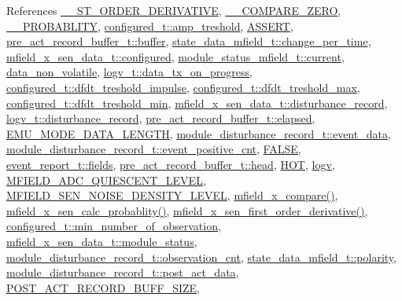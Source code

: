 References \hyperlink{a00021_source_l00030}{\+\_\+\+\_\+S\+T\+\_\+\+O\+R\+D\+E\+R\+\_\+\+D\+E\+R\+I\+V\+A\+T\+I\+V\+E}, \hyperlink{a00021_source_l00027}{\+\_\+\+\_\+\+C\+O\+M\+P\+A\+R\+E\+\_\+\+Z\+E\+R\+O}, \hyperlink{a00021_source_l00033}{\+\_\+\+\_\+\+P\+R\+O\+B\+A\+B\+L\+I\+T\+Y}, \hyperlink{a00021_a4b3bbfb0267daea1432f2603825ade62}{configured\+\_\+t\+::amp\+\_\+treshold}, \hyperlink{a00072_source_l00059}{A\+S\+S\+E\+R\+T}, \hyperlink{a00022_source_l00137}{pre\+\_\+act\+\_\+record\+\_\+buffer\+\_\+t\+::buffer}, \hyperlink{a00019_source_l00102}{state\+\_\+data\+\_\+mfield\+\_\+t\+::change\+\_\+per\+\_\+time}, \hyperlink{a00025_source_l00036}{mfield\+\_\+x\+\_\+sen\+\_\+data\+\_\+t\+::configured}, \hyperlink{a00019_source_l00108}{module\+\_\+status\+\_\+mfield\+\_\+t\+::current}, \hyperlink{a00060_source_l00016}{data\+\_\+non\+\_\+volatile}, \hyperlink{a00021_a6cdefde69642ef511e3252c38be68516}{logv\+\_\+t\+::data\+\_\+tx\+\_\+on\+\_\+progress}, \hyperlink{a00021_source_l00189}{configured\+\_\+t\+::dfdt\+\_\+treshold\+\_\+impulse}, \hyperlink{a00021_source_l00190}{configured\+\_\+t\+::dfdt\+\_\+treshold\+\_\+max}, \hyperlink{a00021_source_l00191}{configured\+\_\+t\+::dfdt\+\_\+treshold\+\_\+min}, \hyperlink{a00025_source_l00041}{mfield\+\_\+x\+\_\+sen\+\_\+data\+\_\+t\+::disturbance\+\_\+record}, \hyperlink{a00021_a11ed024c2cc5c53c79b2c0a8b35e3c06}{logv\+\_\+t\+::disturbance\+\_\+record}, \hyperlink{a00022_source_l00140}{pre\+\_\+act\+\_\+record\+\_\+buffer\+\_\+t\+::elapsed}, \hyperlink{a00022_source_l00015}{E\+M\+U\+\_\+\+M\+O\+D\+E\+\_\+\+D\+A\+T\+A\+\_\+\+L\+E\+N\+G\+T\+H}, \hyperlink{a00022_source_l00228}{module\+\_\+disturbance\+\_\+record\+\_\+t\+::event\+\_\+data}, \hyperlink{a00022_source_l00182}{module\+\_\+disturbance\+\_\+record\+\_\+t\+::event\+\_\+positive\+\_\+cnt}, \hyperlink{a00040_source_l00086}{F\+A\+L\+S\+E}, \hyperlink{a00021_a5296d090c085b0421fdf5a86e382abea}{event\+\_\+report\+\_\+t\+::fields}, \hyperlink{a00022_source_l00142}{pre\+\_\+act\+\_\+record\+\_\+buffer\+\_\+t\+::head}, \hyperlink{a00021_source_l00153}{H\+O\+T}, \hyperlink{a00038_source_l00036}{logv}, \hyperlink{a00019_source_l00029}{M\+F\+I\+E\+L\+D\+\_\+\+A\+D\+C\+\_\+\+Q\+U\+I\+E\+S\+C\+E\+N\+T\+\_\+\+L\+E\+V\+E\+L}, \hyperlink{a00019_source_l00031}{M\+F\+I\+E\+L\+D\+\_\+\+S\+E\+N\+\_\+\+N\+O\+I\+S\+E\+\_\+\+D\+E\+N\+S\+I\+T\+Y\+\_\+\+L\+E\+V\+E\+L}, \hyperlink{a00052_source_l00209}{mfield\+\_\+x\+\_\+compare()}, \hyperlink{a00052_source_l00242}{mfield\+\_\+x\+\_\+sen\+\_\+calc\+\_\+probablity()}, \hyperlink{a00052_source_l00229}{mfield\+\_\+x\+\_\+sen\+\_\+first\+\_\+order\+\_\+derivative()}, \hyperlink{a00021_source_l00200}{configured\+\_\+t\+::min\+\_\+number\+\_\+of\+\_\+observation}, \hyperlink{a00025_source_l00045}{mfield\+\_\+x\+\_\+sen\+\_\+data\+\_\+t\+::module\+\_\+status}, \hyperlink{a00022_source_l00180}{module\+\_\+disturbance\+\_\+record\+\_\+t\+::observation\+\_\+cnt}, \hyperlink{a00019_source_l00104}{state\+\_\+data\+\_\+mfield\+\_\+t\+::polarity}, \hyperlink{a00022_source_l00177}{module\+\_\+disturbance\+\_\+record\+\_\+t\+::post\+\_\+act\+\_\+data}, \hyperlink{a00022_source_l00014}{P\+O\+S\+T\+\_\+\+A\+C\+T\+\_\+\+R\+E\+C\+O\+R\+D\+\_\+\+B\+U\+F\+F\+\_\+\+S\+I\+Z\+E}, 